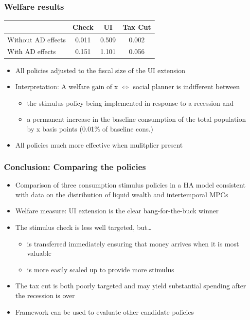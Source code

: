 \documentclass[pdflatex,aspectratio=169]{beamer}
\begin{document}
\begin{frame}
	\frametitle{Welfare results}
	\centering 
	\begin{tabular}{@{}lccc@{}} 
		\toprule 
		& Check      & UI    & Tax Cut    \\  \midrule 
		Without AD effects & 0.011  & 0.509  & 0.002     \\ 
		With AD effects & 0.151  & 1.101  & 0.056     \\ 
	\end{tabular}  
	\medskip
	\begin{itemize}[<+->]
		\itemsep = .75\bigskipamount 
		\item All policies adjusted to the fiscal size of the UI extension
		\item Interpretation: A welfare gain of x $\Leftrightarrow$ social planner is indifferent between 
		\begin{itemize}[<+->]
			\itemsep = .25\bigskipamount 
			\item the stimulus policy being implemented in response to a recession and 
			\item a permanent increase in the baseline consumption of the total population by x basis points (0.01\% of baseline cons.)
		\end{itemize}
		\item All policies much more effective when mulitplier present
	\end{itemize}
\end{frame}

\begin{frame}
	\frametitle{Conclusion: Comparing the policies}
	\begin{itemize}[<+->]
		\itemsep = .5\bigskipamount 
		\item Comparison of three consumption stimulus policies in a HA model consistent with data on the distribution of liquid wealth and intertemporal MPCs 
		\item Welfare measure: UI extension is the clear bang-for-the-buck winner 
		\item The stimulus check is less well targeted, but\ldots 
		\begin{itemize}[<+->]
			\itemsep = .25\bigskipamount 
			\item is transferred immediately ensuring that money arrives when it is most valuable 
			\item is more easily scaled up to provide more stimulus 
		\end{itemize}
		\item The tax cut is both poorly targeted and may yield substantial spending after the recession is over 
		\item Framework can be used to evaluate other candidate policies 
		
	\end{itemize}
	
\end{frame}
\end{document}
